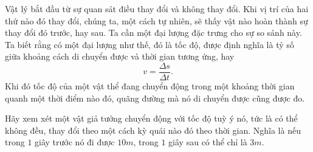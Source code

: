 Vật lý bắt đầu từ sự quan sát điều thay đổi và không thay đổi. Khi vị trí của hai thứ nào đó thay đổi, chúng ta, một cách tự nhiên, sẽ thấy vật nào hoàn thành sự thay đổi đó trước, hay sau. Ta cần một đại lượng đặc trưng cho sự so sánh này. Ta biết rằng có một đại lượng như thế, đó là tốc độ, được định nghĩa là tỷ số giữa khoảng cách di chuyển được và thời gian tương ứng, hay
\[v=\frac{\Delta s}{\Delta t}.\] 
Khi đó tốc độ của một vật thể đang chuyển động trong một khoảng thời gian quanh một thời điểm nào đó, quãng đường mà nó di chuyển được cũng được đo. 
\vspace{8pt}

Hãy xem xét một  vật giả tưởng chuyển động với tốc độ tuỳ ý nó, tức là có thể không đều, thay đổi theo một cách kỳ quái nào đó theo thời gian. Nghĩa là nếu trong \(1\) giây trước nó đi được \(10m\), trong \(1\) giây sau có thể chỉ là \(3m\).
